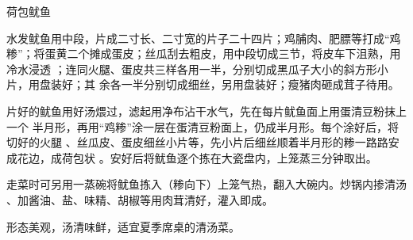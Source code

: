 \begin{recipe}{荷包鱿鱼}

\ingredients



\preparation

\step 水发鱿鱼用中段，片成二寸长、二寸宽的片子二十四片；鸡脯肉、肥膘等打成“鸡
糁”；将蛋黄二个摊成蛋皮；丝瓜刮去粗皮，用中段切成三节，将皮车下沮熟，用冷水浸透
；连同火腿、蛋皮共三样各用一半，分别切成黑瓜子大小的斜方形小片，用盘装好；其
余各一半分别切成细丝，另用盘装好；瘦猪肉砸成茸子待用。

片好的鱿鱼用好汤煨过，滤起用净布沾干水气，先在每片鱿鱼面上用蛋清豆粉抹上一个
半月形，再用“鸡糁”涂一层在蛋清豆粉面上，仍成半月形。每个涂好后，将切好的火腿
、丝瓜皮、蛋皮细丝小片等，先小片后细丝顺着半月形的糁一路路安成花边，成荷包状
。安好后将鱿鱼逐个拣在大瓷盘内，上笼蒸三分钟取出。

\step 走菜时可另用一蒸碗将鱿鱼拣入（糁向下）上笼气热，翻入大碗内。炒锅内掺清汤
、加酱油、盐、味精、胡椒等用肉茸清好，灌入即成。

\features

形态美观，汤清味鲜，适宜夏季席桌的清汤菜。

\end{recipe}


